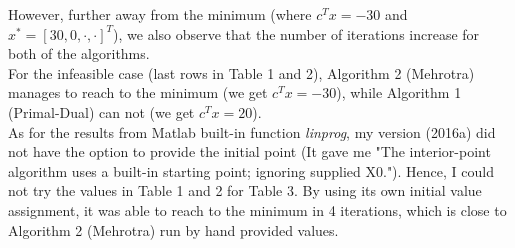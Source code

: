 \documentclass{article}
\begin{document}
However, further away from the minimum (where $c^Tx=-30$ and $ x^*=[30,0,\cdot,\cdot]^T $), we also observe that the number of iterations increase for both of the algorithms. \\

For the infeasible case (last rows in Table 1 and 2), Algorithm 2 (Mehrotra) manages to reach to the minimum (we get $c^Tx=-30$), while Algorithm 1 (Primal-Dual) can not (we get $c^Tx=20$).\\

As for the results from Matlab built-in function \textit{linprog}, my version (2016a) did not have the option to provide the initial point (It gave me "The interior-point algorithm uses a built-in starting point;
ignoring supplied X0."). Hence, I could not try the values in Table 1 and 2 for Table 3. By using its own initial value assignment, it was able to reach to the minimum in 4 iterations, which is close to Algorithm 2 (Mehrotra) run by hand provided values.
\end{document}

